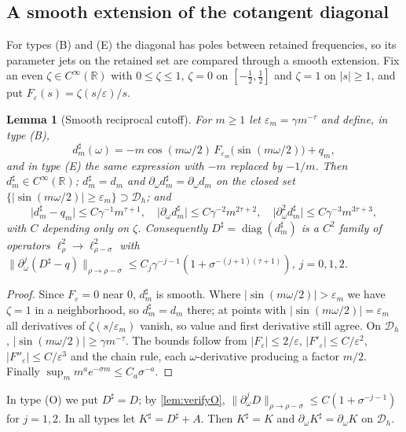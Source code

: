 \documentclass[11pt]{amsart}
\numberwithin{equation}{section}
\newtheorem{lemma}[theorem]{Lemma}
\theoremstyle{definition}
\theoremstyle{remark}
\newcommand{\R}{\mathbb{R}}
\newcommand{\abs}[1]{\lvert #1\rvert}
\newcommand{\norm}[1]{\lVert #1\rVert}
\newcommand{\Dh}{\mathcal D_h}
\begin{document}
\subsection{A smooth extension of the cotangent diagonal}
For types (B) and (E) the diagonal has poles between retained frequencies, so its parameter jets on the retained set are compared through a smooth extension. Fix an even $\zeta\in C^\infty(\R)$ with $0\le\zeta\le1$, $\zeta=0$ on $[-\frac12,\frac12]$ and $\zeta=1$ on $\abs s\ge1$, and put $F_\varepsilon(s)=\zeta(s/\varepsilon)/s$.

\begin{lemma}[Smooth reciprocal cutoff]\label{lem:cutoff}
For $m\ge1$ let $\varepsilon_m=\gamma m^{-\tau}$ and define, in type \textup{(B)},
\[
d_m^\sharp(\omega)=-m\cos(m\omega/2)\,F_{\varepsilon_m}\bigl(\sin(m\omega/2)\bigr)+q_m,
\]
and in type \textup{(E)} the same expression with $-m$ replaced by $-1/m$. Then $d^\sharp_m\in C^\infty(\R)$; $d^\sharp_m=d_m$ and $\partial_\omega d^\sharp_m=\partial_\omega d_m$ on the closed set $\{\abs{\sin(m\omega/2)}\ge\varepsilon_m\}\supset\Dh$; and
\[
\abs{d^\sharp_m-q_m}\le C\gamma^{-1}m^{\tau+1},\quad\abs{\partial_\omega d^\sharp_m}\le C\gamma^{-2}m^{2\tau+2},\quad\abs{\partial^2_\omega d^\sharp_m}\le C\gamma^{-3}m^{3\tau+3},
\]
with $C$ depending only on $\zeta$. Consequently $D^\sharp=\operatorname{diag}(d^\sharp_m)$ is a $C^2$ family of operators $\ell^2_\rho\to\ell^2_{\rho-\sigma}$ with $\norm{\partial^j_\omega(D^\sharp-q)}_{\rho\to\rho-\sigma}\le C_j\gamma^{-j-1}(1+\sigma^{-(j+1)(\tau+1)})$, $j=0,1,2$.
\end{lemma}

\begin{proof}
Since $F_\varepsilon=0$ near $0$, $d^\sharp_m$ is smooth. Where $\abs{\sin(m\omega/2)}>\varepsilon_m$ we have $\zeta=1$ in a neighborhood, so $d^\sharp_m=d_m$ there; at points with $\abs{\sin(m\omega/2)}=\varepsilon_m$ all derivatives of $\zeta(s/\varepsilon_m)$ vanish, so value and first derivative still agree. On $\Dh$, $\abs{\sin(m\omega/2)}\ge\gamma m^{-\tau}$. The bounds follow from $\abs{F_\varepsilon}\le2/\varepsilon$, $\abs{F'_\varepsilon}\le C/\varepsilon^2$, $\abs{F''_\varepsilon}\le C/\varepsilon^3$ and the chain rule, each $\omega$-derivative producing a factor $m/2$. Finally $\sup_mm^ae^{-\sigma m}\le C_a\sigma^{-a}$.
\end{proof}

In type (O) we put $D^\sharp=D$; by \cref{lem:verifyO}, $\norm{\partial_\omega^jD}_{\rho\to\rho-\sigma}\le C(1+\sigma^{-j-1})$ for $j=1,2$. In all types let $K^\sharp=D^\sharp+A$. Then $K^\sharp=K$ and $\partial_\omega K^\sharp=\partial_\omega K$ on $\Dh$.
\end{document}
